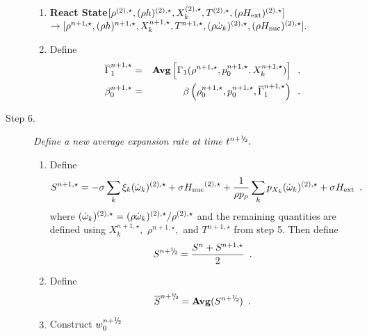 \begin{description}
\begin{enumerate}
\item {\bf React State}$[ \rho^{(2),\star},(\rho h)^{(2),\star}, X_k^{(2),\star}, 
                             T^{(2),\star}, (\rho{H_{\rm ext}})^{(2),\star}] $\\
$\rightarrow [ \rho^{n+1,\star},(\rho h)^{n+1,\star}, X_k^{n+1,\star}, T^{n+1,\star}, 
              (\rho \dot{\omega}_k)^{(2),\star}, (\rho {H_{\rm nuc}})^{(2),\star} ].$  

\item Define
\begin{eqnarray}
 \overline{\Gamma}_1^{n+1,\star}    &=& {\rm{\bf Avg}} \left[ \Gamma_1(\rho^{n+1,\star}, p_0^{n+1,\star}, 
                                                      X_k^{n+1,\star}) \right] \enskip , \\
 {\beta   }_0^{n+1,\star}    &=& \beta   \left(\rho_0^{n+1,\star}, p_0^{n+1,\star}, \overline{\Gamma}_1^{n+1,\star}\right) \enskip .
\end{eqnarray}

\end{enumerate}

\item[Step 6.] {\em Define a new average expansion rate at time $t^\nph.$}

\begin{enumerate}
\renewcommand{\theenumi}{{\bf \alph{enumi}}}
\item Define
\begin{equation}
  S^{n+1,\star} =  -\sigma  \sum_k  \xi_k  (\dot{\omega}_k)^{(2),\star}  + 
  \sigma {H_{\rm nuc}}^{(2),\star} +
  \frac{1}{\rho p_\rho} \sum_k p_{X_k}  ({\dot{\omega}}_k)^{(2),\star}  
  + \sigma {H_{\rm ext}} \enskip .
\end{equation} 
where $(\dot{\omega}_k)^{(2),\star} = (\rho \dot{\omega}_k)^{(2),\star} / \rho^{(2),\star}$
and the remaining quantities are defined using $X_k^{n+1,\star},$ $\rho^{n+1,\star},$ 
and $T^{n+1,\star}$ from step 5.
Then define
\begin{equation}
 S^\nph = \frac{S^n + S^{n+1,\star}}{2} \enskip. 
\end{equation}

\item Define
\begin{equation}
\overline{S}^{\nph} = {\mathrm{\bf Avg}} (S^{\nph}) \enskip.
\end{equation}

\item Construct $w_0^{\nph}$


\end{enumerate}
\end{description}
